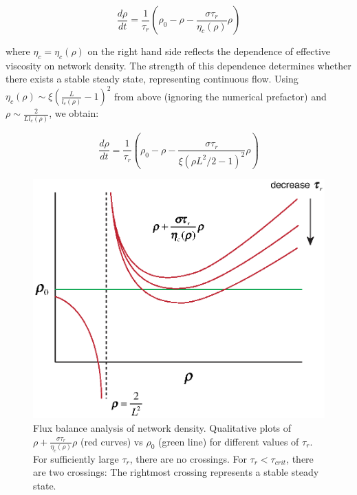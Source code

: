 \begin{equation}
	\label{drho_1}
	\frac{d\rho}{dt}=\frac{1}{\tau_r}\left ( \rho_0 - \rho - \frac{\sigma \tau_r}{\eta_c(\rho)} \rho\right )
\end{equation}

where $\eta_c = \eta_c(\rho)$ on the right hand side reflects the dependence of effective viscosity on network density.  The strength of this dependence determines whether there exists a stable steady state, representing continuous flow.  Using $\eta_c(\rho)\sim \xi \left ( \frac{L}{l_c(\rho)} -1 \right )^2$ from above (ignoring the numerical prefactor) and $\rho \sim \frac{2}{L l_c(\rho)}$, we obtain:


\begin{equation}
	\label{drho_2}
	\frac{d\rho}{dt}=\frac{1}{\tau_r}\left ( \rho_0 - \rho - \frac{\sigma \tau_r}{\xi(\rho L^2/2 -1)^2}\rho\right )
\end{equation}

\begin{figure}[H]
	\centering
	\includegraphics[width=\hsize]{active/figures/FigS0}
	\caption{\label{fig:flux_balance}  Flux balance analysis of network density. Qualitative plots of $\rho+\frac{\sigma \tau_r}{\eta_c(\rho)}\rho$ (red curves) vs $\rho_0$ (green line) for different values of $\tau_r$.  For sufficiently large $\tau_r$, there are no crossings.  For $\tau_r < \tau_{crit}$, there are two crossings:  The rightmost crossing represents a stable steady state.  }
\end{figure}


